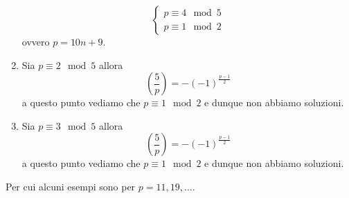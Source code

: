 \begin{esercizio}
\begin{enumerate}
			\begin{equation*}
				\begin{cases}
					p \equiv 4 \mod 5 \\
					p \equiv 1 \mod 2
				\end{cases}
			\end{equation*}
			ovvero $p = 10n + 9$.
		\item Sia $p \equiv 2 \mod 5$ allora 
			\begin{equation*}
				\left(\frac{5}{p}\right) = -(-1)^{\frac{p-1}{2}}
			\end{equation*}
			a questo punto vediamo che $p \equiv 1 \mod 2$ e dunque non
			abbiamo soluzioni.
		\item Sia $p \equiv 3 \mod 5$ allora 
			\begin{equation*}
				\left(\frac{5}{p}\right) = -(-1)^{\frac{p-1}{2}}
			\end{equation*}
			a questo punto vediamo che $p \equiv 1 \mod 2$ e dunque non
			abbiamo soluzioni.
	\end{enumerate}
	Per cui alcuni esempi sono per $p = 11, 19, \dots$.
\end{esercizio}
